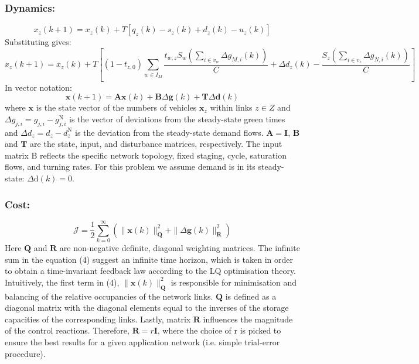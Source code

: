 \documentclass[11pt]{article}
\begin{document}
\subsubsection*{Dynamics:}
\begin{equation}
x_{z}(k+1)=x_{z}(k)+T\left[q_{z}(k)-s_{z}(k)+d_{z}(k)-u_{z}(k)\right]
\end{equation}
Substituting gives:
\begin{equation}
x_{z}(k+1) =x_{z}(k)+T\left[\left(1-t_{z, 0}\right) \sum_{w \in I_{M}} \frac{t_{w, z} S_{w}\left(\sum_{i \in v_{w}} \Delta g_{M, i}(k)\right)}{C} +\Delta d_{z}(k)-\frac{S_{z}\left(\sum_{i \in v_{z}} \Delta g_{N, i}(k)\right)}{C} \right]
\end{equation}
In vector notation: 
\begin{equation}
\mathbf{x}(k+1)=\mathbf{A} \mathbf{x}(k)+\mathbf{B} \Delta \mathbf{g}(k)+\mathbf{T} \Delta \mathbf{d}(k)
\end{equation}
where $ \mathbf{x} $ is the state vector of the numbers of vehicles $ \mathbf{x}_z$ within links $z \in Z$ and $\Delta g_{j, i}=g_{j, i}-g_{j, i}^{\mathrm{N}}$ is the vector of deviations from the steady-state green times and $\Delta d_{z}=d_{z}-d_{z}^{\mathrm{N}}$ is the deviation from the steady-state demand flows. $\mathbf{A}= \mathbf{I}$, $\mathbf{B}$ and  $\mathbf{T}$ are the state, input, and disturbance matrices, respectively. The input matrix B reflects the specific network topology, fixed staging, cycle, saturation flows, and turning rates. For this problem we assume demand is in its steady-state: $\Delta \mathrm{d}(k)=0$.
\subsubsection*{Cost:}
\begin{equation}
\mathcal{J}=\frac{1}{2} \sum_{k=0}^{\infty}\left(\|\mathbf{x}(k)\|_{\mathbf{Q}}^{2}+\|\Delta \mathbf{g}(k)\|_{\mathbf{R}}^{2}\right)
\end{equation}
Here $\mathbf{Q}$ and $\mathbf{R}$ are non-negative definite, diagonal weighting matrices. The infinite sum in the equation (4) suggest an infinite time horizon, which is taken in order to obtain a time-invariant feedback law according to the LQ optimisation theory. Intuitively,  the first term in (4), $\|\mathbf{x}(k)\|_{\mathbf{Q}}^{2}$ is responsible for minimisation and balancing of the relative occupancies of the network links. $\mathbf{Q}$ is defined as a diagonal matrix with the diagonal elements equal to the inverses of the storage capacities of the corresponding links. Lastly, matrix $\mathbf{R}$ influences the magnitude of the control reactions. Therefore,  $\mathbf{R}=r\mathbf{I}$, where the choice of r is picked to ensure the best results for a given application network (i.e. simple trial-error procedure).
\end{document}
